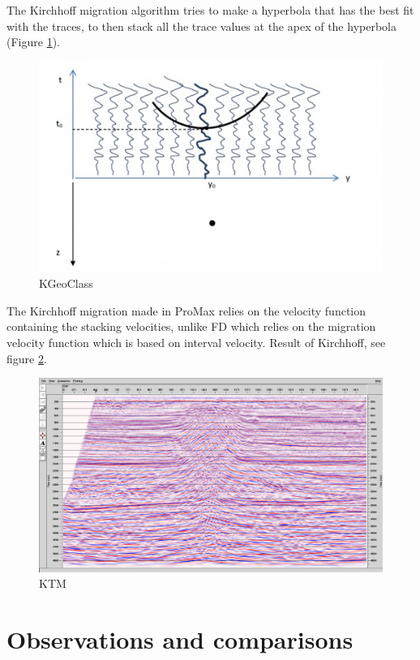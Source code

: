 \documentclass[10pt,a4paper]{article}
\begin{document}
The Kirchhoff migration algorithm tries to make a hyperbola that has the best fit with the traces, to then stack all the trace values at the apex of the hyperbola (Figure \ref{KGeoClass}). 

\begin{figure}[H]
\includegraphics[width=\textwidth]{kirchhoffGeoClass.jpg}
\caption{KGeoClass}
\label{KGeoClass}
\end{figure}

\noindent The Kirchhoff migration made in ProMax relies on the velocity function containing the stacking velocities, unlike FD which relies on the migration velocity function which is based on interval velocity. Result of Kirchhoff, see figure \ref{KTM}.

\begin{figure}[H]
\includegraphics[width=\textwidth]{kirchhmed3aforkirchh.jpg}
\caption{KTM}
\label{KTM}
\end{figure}

\section{Observations and comparisons}
\end{document}
